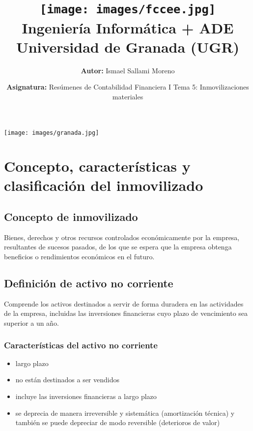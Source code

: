 \documentclass[a4paper,12pt]{article}
\title{
    \vspace{-2cm}
    \texttt{[image: images/fccee.jpg]} \\ %
    \LARGE Ingeniería Informática + ADE\\
    \large Universidad de Granada (UGR)\\[1cm]
}
\author{\textbf{Autor:} Ismael Sallami Moreno}
\date{\textbf{Asignatura:} Resúmenes de Contabilidad Financiera I Tema 5: Inmovilizaciones materiales
}
\begin{document}
\maketitle
\thispagestyle{empty}

\begin{center}
    \texttt{[image: images/granada.jpg]} \\ %
    \vfill
\end{center}

\newpage

\tableofcontents
\newpage

\section{Concepto, características y clasificación del inmovilizado}

\subsection{Concepto de inmovilizado}
Bienes, derechos y otros recursos controlados económicamente por la empresa, resultantes de sucesos pasados, de los que se espera que la empresa obtenga beneficios o rendimientos económicos en el futuro.

\subsection{Definición de activo no corriente}
Comprende los activos destinados a servir de forma duradera en las actividades de la empresa, incluidas las inversiones financieras cuyo plazo de vencimiento sea superior a un año.

\subsubsection{Características del activo no corriente}
\begin{itemize}
    \item largo plazo
    \item no están destinados a ser vendidos
    \item incluye las inversiones financieras a largo plazo
    \item se deprecia de manera irreversible y sistemática (amortización técnica) y también se puede depreciar de modo reversible (deterioros de valor)
\end{itemize}
\end{document}
